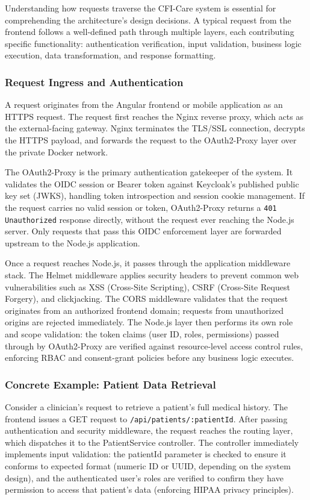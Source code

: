 Understanding how requests traverse the CFI-Care system is essential for
comprehending the architecture's design decisions. A typical request from the
frontend follows a well-defined path through multiple layers, each contributing
specific functionality: authentication verification, input validation, business
logic execution, data transformation, and response formatting.

\subsubsection{Request Ingress and Authentication}
A request originates from the Angular frontend or mobile application as an
HTTPS request. The request first reaches the Nginx reverse proxy, which acts
as the external-facing gateway. Nginx terminates the TLS/SSL connection,
decrypts the HTTPS payload, and forwards the request to the OAuth2-Proxy
layer over the private Docker network.

The OAuth2-Proxy is the primary authentication gatekeeper of the system. It
validates the OIDC session or Bearer token against Keycloak's published public
key set (JWKS), handling token introspection and session cookie management. If
the request carries no valid session or token, OAuth2-Proxy returns a
\texttt{401 Unauthorized} response directly, without the request ever
reaching the Node.js server. Only requests that pass this OIDC enforcement
layer are forwarded upstream to the Node.js application.

Once a request reaches Node.js, it passes through the application middleware
stack. The Helmet middleware applies security headers to prevent common web
vulnerabilities such as XSS (Cross-Site Scripting), CSRF (Cross-Site Request
Forgery), and clickjacking. The CORS middleware validates that the request
originates from an authorized frontend domain; requests from unauthorized
origins are rejected immediately. The Node.js layer then performs its own
role and scope validation: the token claims (user ID, roles, permissions)
passed through by OAuth2-Proxy are verified against resource-level access
control rules, enforcing \ac{RBAC} and consent-grant policies before any
business logic executes.

\subsubsection{Concrete Example: Patient Data Retrieval}
Consider a clinician's request to retrieve a patient's full medical history.
The frontend issues a GET request to \texttt{/api/patients/:patientId}. After
passing authentication and security middleware, the request reaches the routing
layer, which dispatches it to the PatientService controller. The controller
immediately implements input validation: the patientId parameter is checked to
ensure it conforms to expected format (numeric ID or UUID, depending on the
system design), and the authenticated user's roles are verified to confirm they
have permission to access that patient's data (enforcing \ac{HIPAA} privacy
principles).


